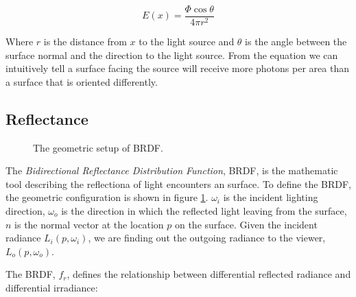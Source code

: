 \begin{equation}
E(x) = \frac{\Phi \cos{\theta}}{4\pi r^{2}} 
\end{equation}

Where \(r\) is the distance from \(x\) to the light source and \(\theta\) is the angle between the surface normal and the direction to the light source. From the equation we can intuitively tell a surface facing the source will receive more photons per area than a surface that is oriented differently.   

\subsection{Reflectance} 
\begin{figure}[htp] 
    \centering 
    \renewcommand{\thefigure}{\thechapter.\arabic{figure}}
    \caption[]{The geometric setup of BRDF. }
    \label{fig:brdf} 
\end{figure} 

The \emph{Bidirectional Reflectance Distribution Function}, BRDF, is the mathematic tool describing the reflectiona of light encounters an surface. To define the BRDF, the geometric configuration is shown in figure \ref{fig:brdf}. \(\omega_{i}\) is the incident lighting direction, \(\omega_{o}\) is the direction in which the reflected light leaving from the surface, \(n\) is the normal vector at the location \(p\) on the surface. Given the incident radiance \(L_{i}(p, \omega_{i})\), we are finding out the outgoing radiance to the viewer, \(L_{o}(p, \omega_{o})\). 

The BRDF, \(f_{r}\), defines the relationship between differential reflected radiance and differential irradiance: 


